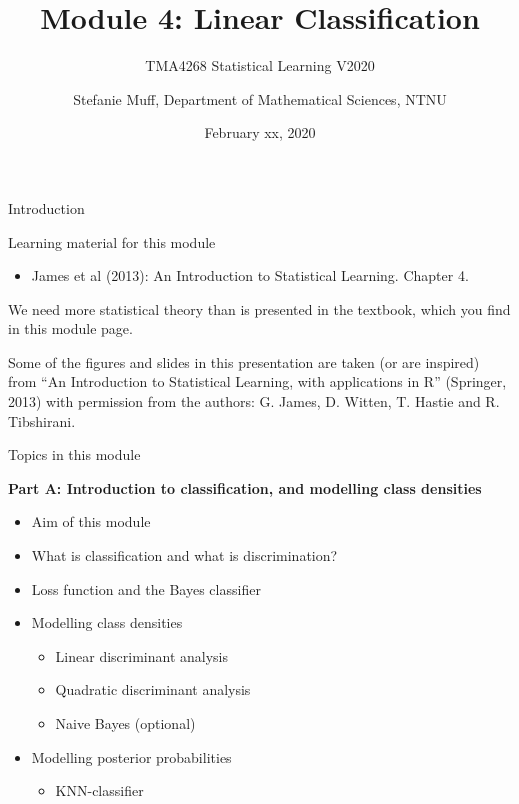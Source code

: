 \documentclass[10pt,ignorenonframetext,]{beamer}
\title{Module 4: Linear Classification}
\subtitle{TMA4268 Statistical Learning V2020}
\author{Stefanie Muff, Department of Mathematical Sciences, NTNU}
\date{February xx, 2020}
\providecommand{\tightlist}{%
  \setlength{\itemsep}{0pt}\setlength{\parskip}{0pt}}
\begin{document}
\frame{\titlepage}

\begin{frame}{Introduction}

\begin{block}{Learning material for this module}

\begin{itemize}
\tightlist
\item
  James et al (2013): An Introduction to Statistical Learning. Chapter
  4.
\end{itemize}

We need more statistical theory than is presented in the textbook, which
you find in this module page.

Some of the figures and slides in this presentation are taken (or are
inspired) from ``An Introduction to Statistical Learning, with
applications in R'' (Springer, 2013) with permission from the authors:
G. James, D. Witten, T. Hastie and R. Tibshirani.

\end{block}

\end{frame}

\begin{frame}

\begin{block}{Topics in this module}

\textbf{Part A: Introduction to classification, and modelling class
densities }

\begin{itemize}
\tightlist
\item
  Aim of this module
\item
  What is classification and what is discrimination?
\item
  Loss function and the Bayes classifier
\item
  Modelling class densities

  \begin{itemize}
  \tightlist
  \item
    Linear discriminant analysis
  \item
    Quadratic discriminant analysis
  \item
    Naive Bayes (optional)
  \end{itemize}
\item
  Modelling posterior probabilities

  \begin{itemize}
  \tightlist
  \item
    KNN-classifier
  \end{itemize}
\end{itemize}

\end{block}

\end{frame}
\end{document}
